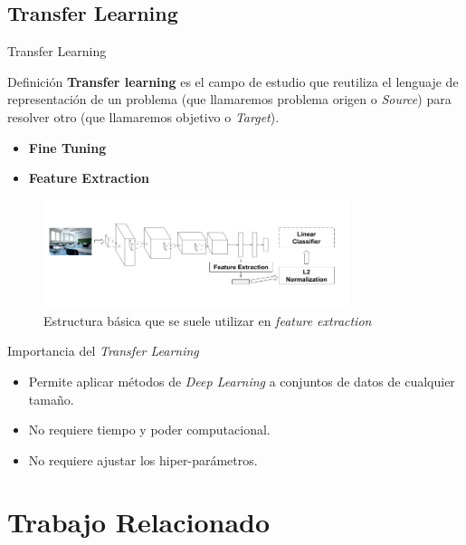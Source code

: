 \documentclass{beamer}
\begin{document}
\subsection{Transfer Learning}
\begin{frame}{Transfer Learning}

\begin{block}{Definición}
\textbf{Transfer learning} es el campo de estudio que reutiliza el lenguaje de representación de un problema (que llamaremos problema origen o \textit{Source}) para resolver otro (que llamaremos objetivo o \textit{Target}). 

\begin{itemize}
\item \textbf{Fine Tuning}
\item \textbf{Feature Extraction}
\end{itemize}
\end{block}

\begin{figure}[H]
\centering
\includegraphics[width = 0.8\textwidth]{Images/basecrop.png} 
\caption{Estructura básica que se suele utilizar en \textit{feature extraction}
\label{fig:base}}
\end{figure}
\end{frame}

\begin{frame}{Importancia del \textit{Transfer Learning}}
\begin{itemize}
\item Permite aplicar métodos de \textit{Deep Learning} a conjuntos de datos de cualquier tamaño.
\item No requiere tiempo y poder computacional.
\item No requiere ajustar los hiper-parámetros. 
\end{itemize}
\end{frame}

\section{Trabajo Relacionado}
\end{document}

